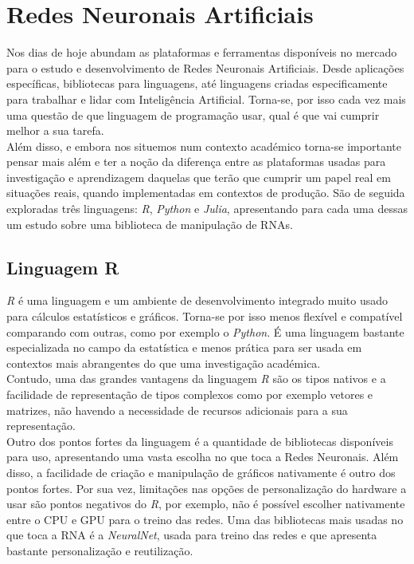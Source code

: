 \section*{Redes Neuronais Artificiais}\label{sec:RNA}

Nos dias de hoje abundam as plataformas e ferramentas disponíveis no mercado para o estudo e desenvolvimento de Redes Neuronais Artificiais. Desde aplicações específicas, bibliotecas para linguagens, até linguagens criadas especificamente para trabalhar e lidar com Inteligência Artificial. Torna-se, por isso cada vez mais uma questão de que linguagem de programação usar, qual é que vai cumprir melhor a sua tarefa.
\\
Além disso, e embora nos situemos num contexto académico torna-se importante pensar mais além e ter a noção da diferença entre as plataformas usadas para investigação e aprendizagem daquelas que terão que cumprir um papel real em situações reais, quando implementadas em contextos de produção. São de seguida exploradas três linguagens: \textit{R}, \textit{Python} e \textit{Julia}, apresentando para cada uma dessas um estudo sobre uma biblioteca de manipulação de RNAs.


\subsection*{Linguagem R}

\textit{R} é uma linguagem e um ambiente de desenvolvimento integrado muito usado para cálculos estatísticos e gráficos. Torna-se por isso menos flexível e compatível comparando com outras, como por exemplo o \textit{Python}. É uma linguagem bastante especializada no campo da estatística e menos prática para ser usada em contextos mais abrangentes do que uma investigação académica.\\
Contudo, uma das grandes vantagens da linguagem \textit{R} são os tipos nativos e a facilidade de representação de tipos complexos como por exemplo vetores e matrizes, não havendo a necessidade de recursos adicionais para a sua representação.\\
Outro dos pontos fortes da linguagem é a quantidade de bibliotecas disponíveis para uso, apresentando uma vasta escolha no que toca a Redes Neuronais. Além disso, a facilidade de criação e manipulação de gráficos nativamente é outro dos pontos fortes. Por sua vez, limitações nas opções de personalização do hardware a usar são pontos negativos do \textit{R}, por exemplo, não é possível escolher nativamente entre o CPU e GPU para o treino das redes.
Uma das bibliotecas mais usadas no que toca a RNA é a \textit{NeuralNet}, usada para treino das redes e que apresenta bastante personalização e reutilização.

